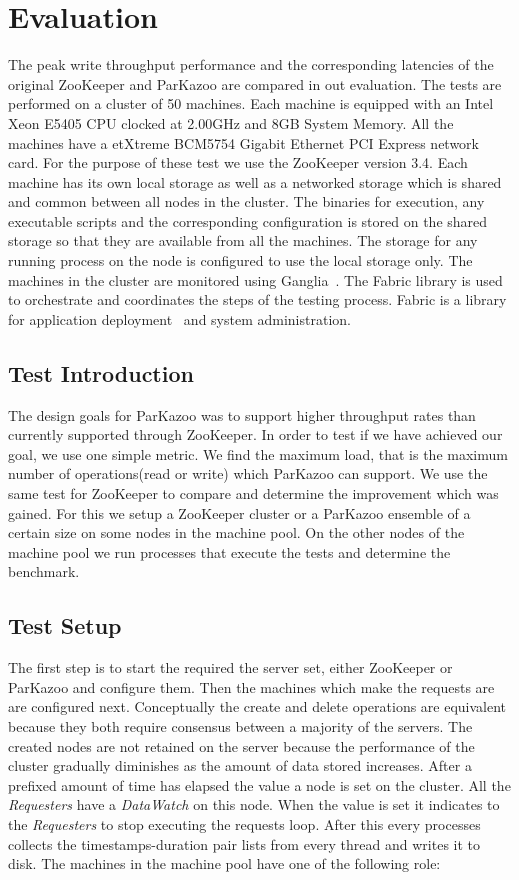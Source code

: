 \chapter{Evaluation}

The peak write throughput performance and the corresponding latencies of the original ZooKeeper and ParKazoo are compared in out evaluation. The tests are performed on a cluster of 50 machines. Each machine is equipped with an Intel\textsuperscript{\textregistered}  Xeon\textsuperscript{\texttrademark}  E5405 CPU clocked at 2.00GHz and 8GB System Memory. All the machines have a etXtreme BCM5754 Gigabit Ethernet PCI Express network card. For the purpose of these test we use the ZooKeeper version 3.4.
Each machine has its own local storage as well as a networked storage which is shared and common between all nodes in the cluster. The binaries for execution, any executable scripts and the corresponding configuration is stored on the shared storage so that they are available from all the machines. The storage for any running process on the node is configured to use the local storage only.
The machines in the cluster are monitored using Ganglia~\cite{sacerdoti2003wide}. The Fabric library is used to orchestrate and coordinates the steps of the testing process. Fabric is a library for application deployment~\cite{spotswood2003systems} and system administration.

\section{Test Introduction}
The design goals for ParKazoo was to support higher throughput rates than currently supported through ZooKeeper. In order to test if we have achieved our goal, we use one simple metric. We find the maximum load, that is the maximum number of operations(read or write) which ParKazoo can support. We use the same test for ZooKeeper to compare and determine the improvement which was gained. For this we setup a ZooKeeper cluster or a ParKazoo ensemble of a certain size on some nodes in the machine pool. On the other nodes of the machine pool we run processes that execute the tests and determine the benchmark.

\section{Test Setup}
The first step is to start the required the server set, either ZooKeeper or ParKazoo and configure them. Then the machines which make the requests are are configured next.  Conceptually the create and delete operations are equivalent because they both require consensus between a majority of the servers. The created nodes are not retained on the server because the performance of the cluster gradually diminishes as the amount of data stored increases. After a prefixed amount of time has elapsed the value a node is set on the cluster. All the \textit{Requesters} have a \textit{DataWatch} on this node. When the value is set it indicates to the \textit{Requesters} to stop executing the requests loop. After this every processes collects the timestamps-duration pair lists from every thread and writes it to disk. 
The machines in the machine pool have one of the following role:
